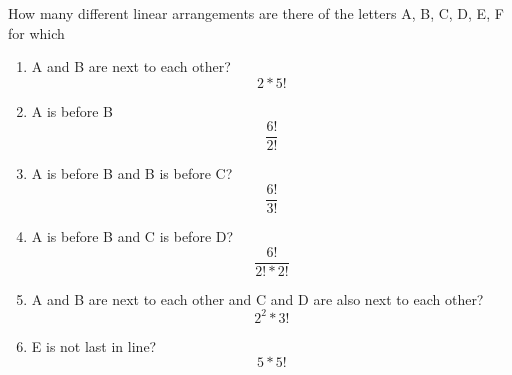 \item  How many different linear arrangements are there of the letters A, B, C, D, E, F for which
\begin{enumerate}
    \item A and B are next to each other?
    \[ 2 * 5! \]
    \item A is before B
    \[ \frac{6!}{2!} \]
    \item A is before B and B is before C?
    \[ \frac{6!}{3!} \]
    \item A is before B and C is before D?
    \[ \frac{6!}{2! * 2!} \]
    \item A and B are next to each other and C and D are also next to each other?
    \[ 2^2 * 3! \]
    \item E is not last in line?
    \[ 5 * 5! \]
\end{enumerate}